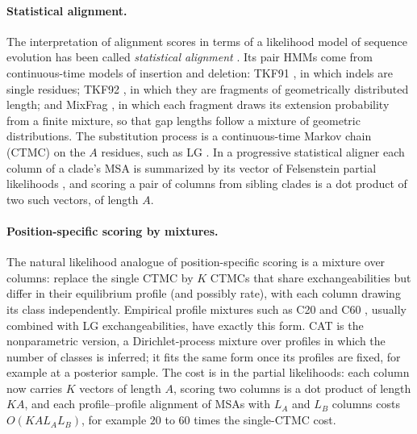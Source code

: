 \documentclass[11pt]{article}
\begin{document}
\paragraph{Statistical alignment.} The interpretation of alignment scores in
terms of a likelihood model of sequence evolution has been called
\emph{statistical alignment} \citep{Hein2000}. Its pair HMMs come from
continuous-time models of insertion and deletion: TKF91
\citep{ThorneKishinoFelsenstein1991}, in which indels are single residues;
TKF92 \citep{ThorneKishinoFelsenstein1992}, in which they are fragments of
geometrically distributed length; and MixFrag \citep{HolmesMixFrag}, in which
each fragment draws its extension probability from a finite mixture, so that
gap lengths follow a mixture of geometric distributions. The substitution
process is a continuous-time Markov chain (CTMC) on the $A$ residues, such as
LG \citep{LeGascuel2008}. In a progressive statistical aligner each column of
a clade's MSA is summarized by its vector of Felsenstein partial likelihoods
\citep{Felsenstein81}, and scoring a pair of columns from sibling clades is a
dot product of two such vectors, of length $A$.

\paragraph{Position-specific scoring by mixtures.} The natural likelihood
analogue of position-specific scoring is a mixture over columns: replace the
single CTMC by $K$ CTMCs that share exchangeabilities but differ in their
equilibrium profile (and possibly rate), with each column drawing its class
independently. Empirical profile mixtures such as C20 and C60
\citep{LeGascuelLartillot2008}, usually combined with LG exchangeabilities,
have exactly this form. CAT \citep{Lartillot2004} is the nonparametric
version, a Dirichlet-process mixture over profiles in which the number of
classes is inferred; it fits the same form once its profiles are fixed, for
example at a posterior sample. The cost is in the partial likelihoods: each
column now carries $K$ vectors of length $A$, scoring two columns is a dot
product of length $KA$, and each profile--profile alignment of MSAs with
$L_A$ and $L_B$ columns costs $O(KAL_AL_B)$, for example $20$ to $60$ times
the single-CTMC cost.
\end{document}
